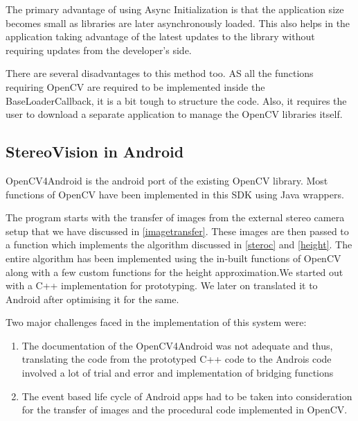 \documentclass[11pt]{report}
\begin{document}
The primary advantage of using Async Initialization is that the application size becomes small as libraries are later asynchronously loaded. This also helps in the application taking advantage of the latest updates to the library without requiring updates from the developer's side.

There are several disadvantages to this method too. AS all the functions requiring OpenCV are required to be implemented inside the BaseLoaderCallback, it is a bit tough to structure the code. Also, it requires the user to download a separate application to manage the OpenCV libraries itself.

\subsection{StereoVision in Android}

OpenCV4Android is the android port of the existing OpenCV library. Most functions of OpenCV have been implemented in this SDK using Java wrappers. 

The program starts with the transfer of images from the external stereo camera setup that we have discussed in \ref{imagetransfer}. These images are then passed to a function which implements the algorithm discussed in \ref{steroc} and \ref{height}. The entire algorithm has been implemented using the in-built functions of OpenCV along with a few custom functions for the height approximation.We started out with a C++ implementation for prototyping. We later on translated it to Android after optimising it for the same.

Two major challenges faced in the implementation of this system were:

\begin{enumerate}
\item The documentation of the OpenCV4Android was not adequate and thus, translating the code from the prototyped C++ code to the Androis code involved a lot of trial and error and implementation of bridging functions

\item The event based life cycle of Android apps had to be taken into consideration for the transfer of images and the procedural code implemented in OpenCV.
\end{enumerate}
\end{document}
